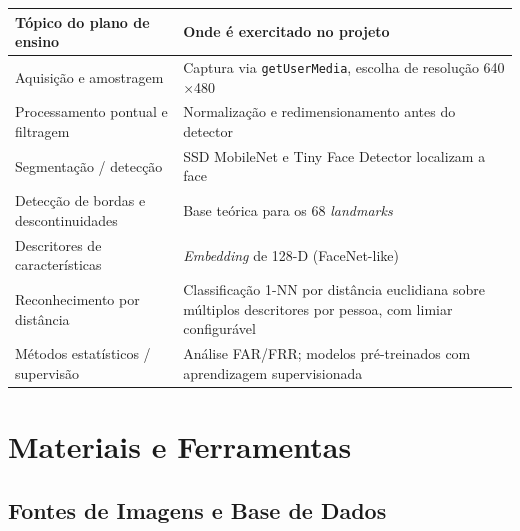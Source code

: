 \documentclass[12pt,a4paper]{article}
\begin{document}
\begin{center}
\begin{tabular}{lp{8.5cm}}
\toprule
\textbf{T\'opico do plano de ensino} & \textbf{Onde \'e exercitado no projeto} \\
\midrule
Aquisi\c{c}\~ao e amostragem & Captura via \texttt{getUserMedia}, escolha de resolu\c{c}\~ao 640$\times$480 \\
Processamento pontual e filtragem & Normaliza\c{c}\~ao e redimensionamento antes do detector \\
Segmenta\c{c}\~ao / detec\c{c}\~ao & SSD MobileNet e Tiny Face Detector localizam a face \\
Detec\c{c}\~ao de bordas e descontinuidades & Base te\'orica para os 68 \emph{landmarks} \\
Descritores de caracter\'isticas & \emph{Embedding} de 128-D (FaceNet-like) \\
Reconhecimento por dist\^ancia & Classifica\c{c}\~ao 1-NN por dist\^ancia euclidiana sobre m\'ultiplos descritores por pessoa, com limiar configur\'avel \\
M\'etodos estat\'isticos / supervis\~ao & An\'alise FAR/FRR; modelos pr\'e-treinados com aprendizagem supervisionada \\
\bottomrule
\end{tabular}
\end{center}

\section{Materiais e Ferramentas}

\subsection{Fontes de Imagens e Base de Dados}
\end{document}
